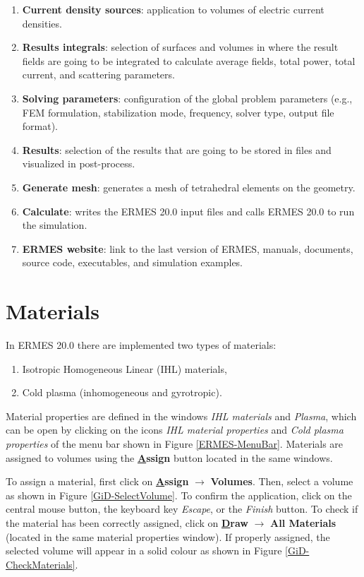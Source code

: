 \begin{enumerate}
	\item \textbf{Current density sources}: application to volumes of electric current densities.

	\item \textbf{Results integrals}: selection of surfaces and volumes in where the result fields are going to be integrated to calculate average fields, total power, total current, and scattering parameters.

	\item \textbf{Solving parameters}: configuration of the global problem parameters (e.g., FEM formulation, stabilization mode, frequency, solver type, output file format).

	\item \textbf{Results}: selection of the results that are going to be stored in files and visualized in post-process.

	\item \textbf{Generate mesh}: generates a mesh of tetrahedral elements on the geometry.

	\item \textbf{Calculate}: writes the ERMES 20.0 input files and calls ERMES 20.0 to run the simulation.

	\item \textbf{ERMES website}: link to the last version of ERMES, manuals, documents, source code, executables, and simulation examples.
\end{enumerate}

\section{Materials}\label{Materials-Section}

In ERMES 20.0 there are implemented two types of materials:
\begin{enumerate}\itemsep0em 
	\item Isotropic Homogeneous Linear (IHL) materials,
	\item Cold plasma (inhomogeneous and gyrotropic).
\end{enumerate}
Material properties are defined in the windows \textit{IHL materials} and \textit{Plasma}, which can be open by clicking on the icons \textit{IHL material properties} and \textit{Cold plasma properties} of the menu bar shown in Figure \ref{ERMES-MenuBar}. Materials are assigned to volumes using the \textbf{\underline{A}ssign} button located in the same windows.

To assign a material, first click on \textbf{\underline{A}ssign} $\rightarrow$ \textbf{Volumes}. Then, select a volume as shown in Figure \ref{GiD-SelectVolume}. To confirm the application, click on the central mouse button, the keyboard key \textit{Escape}, or the \textit{Finish} button. To check if the material has been correctly assigned, click on \textbf{\underline{D}raw} $\rightarrow$ \textbf{All Materials} (located in the same material properties window). If properly assigned, the selected volume will appear in a solid colour as shown in Figure \ref{GiD-CheckMaterials}. 

